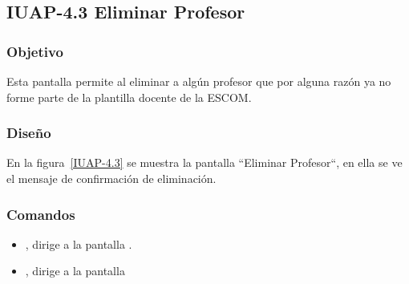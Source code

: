 \subsection{IUAP-4.3  Eliminar  Profesor}

\subsubsection{Objetivo}

	
    Esta pantalla permite al  eliminar a algún profesor que por alguna razón ya no forme parte de la plantilla docente de la ESCOM.
\subsubsection{Diseño}


    En la figura~\ref{IUAP-4.3} se muestra la pantalla ``Eliminar Profesor“, en ella se ve el mensaje de confirmación de eliminación.



\subsubsection{Comandos}
    \begin{itemize}
	\item {}, dirige a la pantalla .
	\item {}, dirige a la pantalla 
    \end{itemize}
